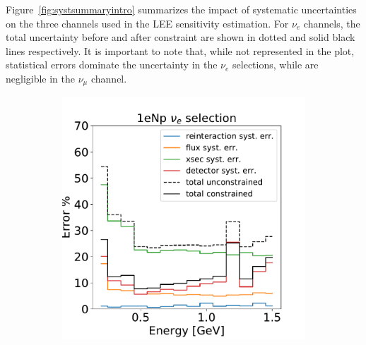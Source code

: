 Figure~\ref{fig:systsummaryintro} summarizes the impact of systematic uncertainties on the three channels used in the LEE sensitivity estimation. For $\nu_e$ channels, the total uncertainty before and after constraint are shown in dotted and solid black lines respectively. It is important to note that, while not represented in the plot, statistical errors dominate the uncertainty in the $\nu_e$ selections, while are negligible in the $\nu_{\mu}$ channel.

\begin{figure}[H] 
\begin{center}
    \begin{subfigure}[b]{0.32\textwidth}
    \centering
    \includegraphics[width=1.00\textwidth]{Systematics/1eNp_syst_summary.pdf}
    \caption{\label{fig:systsummary:np}\npsel}
    \end{subfigure}
    \begin{subfigure}[b]{0.32\textwidth}
    \centering

\end{subfigure}
\end{center}
\end{figure}
